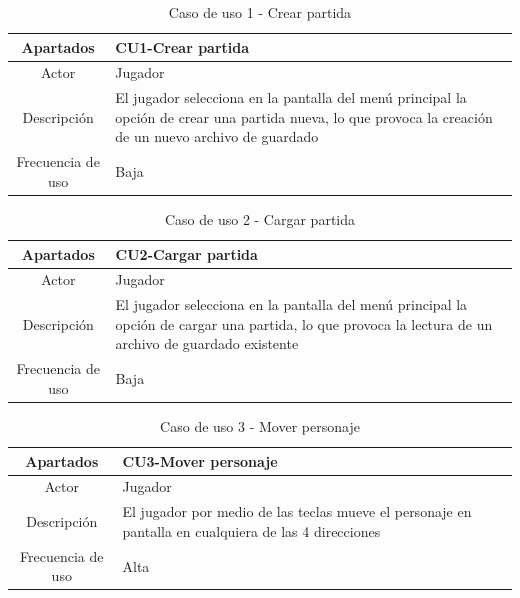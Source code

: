 \documentclass[a4paper]{article}
\begin{document}
\clearpage

\begin{table}[ht]
    \centering
    \begin{tabular}{|c|p{14cm}|} 
        \hline
        \textbf{Apartados}       & \textbf{CU1-Crear partida} \\
        \hline
        Actor                    & Jugador \\
        \hline
        Descripción              & El jugador selecciona en la pantalla del menú principal la opción de crear una partida nueva, lo que provoca la creación de un nuevo archivo de guardado \\
        \hline
        Frecuencia de uso        & Baja \\
        \hline
    \end{tabular}
    \caption{Caso de uso 1 - Crear partida}
    \label{tab:casosdeuso-table}
\end{table}

\begin{table}[ht]
    \centering
    \begin{tabular}{|c|p{14cm}|} 
        \hline
        \textbf{Apartados}       & \textbf{CU2-Cargar partida} \\
        \hline
        Actor                    & Jugador \\
        \hline
        Descripción              & El jugador selecciona en la pantalla del menú principal la opción de cargar una partida, lo que provoca la lectura de un archivo de guardado existente \\
        \hline
        Frecuencia de uso        & Baja \\
        \hline
    \end{tabular}
    \caption{Caso de uso 2 - Cargar partida}
    \label{tab:casosdeuso-table}
\end{table}

\begin{table}[ht]
    \centering
    \begin{tabular}{|c|p{14cm}|} 
        \hline
        \textbf{Apartados}       & \textbf{CU3-Mover personaje} \\
        \hline
        Actor                    & Jugador \\
        \hline
        Descripción              & El jugador por medio de las teclas mueve el personaje en pantalla en cualquiera de las 4 direcciones \\
        \hline
        Frecuencia de uso        & Alta \\
        \hline
    \end{tabular}
    \caption{Caso de uso 3 - Mover personaje}
    \label{tab:casosdeuso-table}
\end{table}
\end{document}
